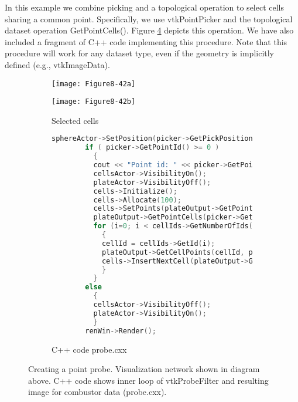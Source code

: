 In this example we combine picking and a topological operation to select cells sharing a common point. Specifically, we use vtkPointPicker and the topological dataset operation GetPointCells(). Figure \ref{fig:Figure8-42} depicts this operation. We have also included a fragment of C++ code implementing this procedure. Note that this procedure will work for any dataset type, even if the geometry is implicitly defined (e.g., vtkImageData).

\begin{figure}[!htb]
    \centering
    \begin{subfigure}{0.48\linewidth}
        \centering
        \texttt{[image: Figure8-42a]}
        \caption*{}\label{fig:Figure8-42a}
    \end{subfigure}
    \hfill
    \begin{subfigure}{0.48\linewidth}
        \centering
        \texttt{[image: Figure8-42b]}
        \caption{Selected cells}\label{fig:Figure8-42b}
    \end{subfigure}%
    \hfill
    \begin{subfigure}{0.96\linewidth}
        \centering
        \begin{lstlisting}[language=C++,  caption={}, numbers=none, frame=none]
        sphereActor->SetPosition(picker->GetPickPosition());
        if ( picker->GetPointId() >= 0 )
          {
          cout << "Point id: " << picker->GetPointId() << "\n";
          cellsActor->VisibilityOn();
          plateActor->VisibilityOff();
          cells->Initialize();
          cells->Allocate(100);
          cells->SetPoints(plateOutput->GetPoints());
          plateOutput->GetPointCells(picker->GetPointId(), cellIds);
          for (i=0; i < cellIds->GetNumberOfIds(); i++)
            {
            cellId = cellIds->GetId(i);
            plateOutput->GetCellPoints(cellId, ptIds);
            cells->InsertNextCell(plateOutput->GetCellType(cellId), ptIds);
            }
          }
        else
          {
          cellsActor->VisibilityOff();
          plateActor->VisibilityOn();
          }
        renWin->Render();
        \end{lstlisting}
        \caption{C++ code probe.cxx}\label{fig:Figure8-42c}
    \end{subfigure}%
    \caption{Creating a point probe. Visualization network shown in diagram above. C++ code shows inner loop of vtkProbeFilter and resulting image for combustor data (probe.cxx).}
    \label{fig:Figure8-42}
\end{figure}

